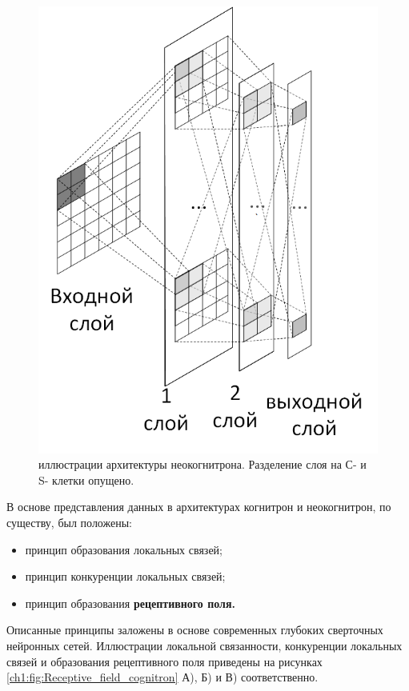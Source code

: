 \documentclass[12pt]{article}
\begin{document}
\begin{sloppypar}
    \begin{figure} [!h]
    	\begin{center}
    		\includegraphics[width=0.45\linewidth]{./figuresch1/neocognitron.png}
    		\caption{иллюстрации архитектуры неокогнитрона. Разделение слоя на С- и S- клетки опущено.}		
    		\label{ch1:fig:neocognitron}
    	\end{center}
    \end{figure}

В основе представления данных в архитектурах когнитрон и неокогнитрон, по существу, был положены: 
\begin{itemize}
    \item принцип образования локальных связей;
    \item принцип конкуренции локальных связей;
    \item принцип образования \textbf{рецептивного поля.}
\end{itemize}
Описанные принципы заложены в основе современных глубоких сверточных нейронных сетей.
Иллюстрации локальной связанности, конкуренции локальных связей и образования рецептивного поля приведены на рисунках \ref{ch1:fig:Receptive_field_cognitron} А), Б) и В) соответственно. 


\end{sloppypar}
\end{document}
